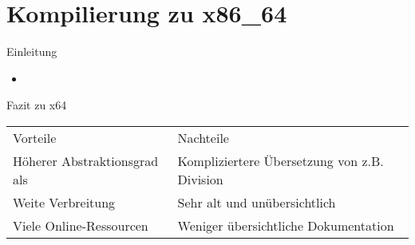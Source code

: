 \section{Kompilierung zu x86\_64}
\begin{frame}{Einleitung}
	\begin{itemize}
		\item {}
	\end{itemize}
\end{frame}

\begin{frame}{Fazit zu x64}
	\begin{table}[h]
		\begin{tabularx}{0.95\textwidth}{L|L}
			 Vorteile       &  Nachteile                 \\
			Höherer Abstraktionsgrad als \riscv & Kompliziertere Übersetzung von z.B. Division \\
			Weite Verbreitung                   & Sehr alt und unübersichtlich                 \\
			Viele Online-Ressourcen             & Weniger übersichtliche Dokumentation         \\
		\end{tabularx}
	\end{table}
\end{frame}
